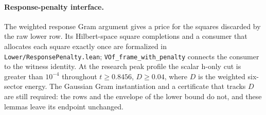 \documentclass[11pt,a4paper]{article}
\begin{document}
\paragraph{Response-penalty interface.}
The weighted response Gram argument gives a price for the squares discarded by
the raw lower row. Its Hilbert-space square completions and a consumer that
allocates each square exactly once are formalized in
\texttt{Lower/ResponsePenalty.lean};
\texttt{VOf\_frame\_with\_penalty} connects the consumer to the witness identity.
At the research peak profile the scalar h-only cut is greater than $10^{-4}$
throughout $t\geq0.8456$, $D\geq0.04$, where $D$ is the weighted six-sector energy.
The Gaussian Gram instantiation and a certificate that tracks $D$ are still
required: the rows and the envelope of the lower bound do not, and these lemmas
leave its endpoint unchanged.
\end{document}
